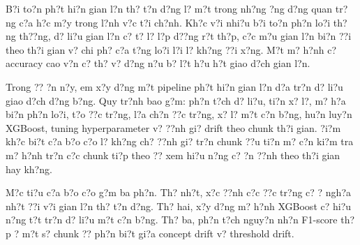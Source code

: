 B?i to?n ph?t hi?n gian l?n th? t?n d?ng l? m?t trong nh?ng ?ng d?ng quan tr?ng c?a h?c m?y trong l?nh v?c t?i ch?nh. Kh?c v?i nhi?u b?i to?n ph?n lo?i th?ng th??ng, d? li?u gian l?n c? t? l? l?p d??ng r?t th?p, c?c m?u gian l?n bi?n ??i theo th?i gian v? chi ph? c?a t?ng lo?i l?i l? kh?ng ??i x?ng. M?t m? h?nh c? accuracy cao v?n c? th? v? d?ng n?u b? l?t h?u h?t giao d?ch gian l?n.

Trong ?? ?n n?y, em x?y d?ng m?t pipeline ph?t hi?n gian l?n d?a tr?n d? li?u giao d?ch d?ng b?ng. Quy tr?nh bao g?m: ph?n t?ch d? li?u, ti?n x? l?, m? h?a bi?n ph?n lo?i, t?o ??c tr?ng, l?a ch?n ??c tr?ng, x? l? m?t c?n b?ng, hu?n luy?n XGBoost, tuning hyperparameter v? ??nh gi? drift theo chunk th?i gian. ?i?m kh?c bi?t c?a b?o c?o l? kh?ng ch? ??nh gi? tr?n chunk ??u ti?n m? c?n ki?m tra m? h?nh tr?n c?c chunk ti?p theo ?? xem hi?u n?ng c? ?n ??nh theo th?i gian hay kh?ng.

M?c ti?u c?a b?o c?o g?m ba ph?n. Th? nh?t, x?c ??nh c?c ??c tr?ng c? ? ngh?a nh?t ??i v?i gian l?n th? t?n d?ng. Th? hai, x?y d?ng m? h?nh XGBoost c? hi?u n?ng t?t tr?n d? li?u m?t c?n b?ng. Th? ba, ph?n t?ch nguy?n nh?n F1-score th?p ? m?t s? chunk ?? ph?n bi?t gi?a concept drift v? threshold drift.
